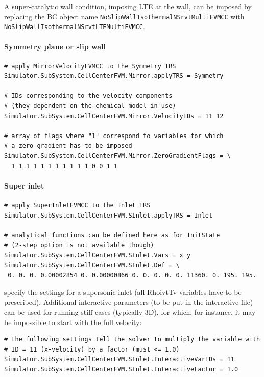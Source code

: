 \documentclass[11pt]{article}
\begin{document}
A super-catalytic wall condition, imposing LTE at the wall, can be imposed by replacing 
the BC object name {\tt NoSlipWallIsothermalNSrvtMultiFVMCC} with 
{\tt NoSlipWallIsothermalNSrvtLTEMultiFVMCC}. 

\paragraph{Symmetry plane or slip wall}

\begin{lstlisting}[breaklines]
# apply MirrorVelocityFVMCC to the Symmetry TRS 
Simulator.SubSystem.CellCenterFVM.Mirror.applyTRS = Symmetry

# IDs corresponding to the velocity components 
# (they dependent on the chemical model in use)
Simulator.SubSystem.CellCenterFVM.Mirror.VelocityIDs = 11 12

# array of flags where "1" correspond to variables for which 
# a zero gradient has to be imposed
Simulator.SubSystem.CellCenterFVM.Mirror.ZeroGradientFlags = \
  1 1 1 1 1 1 1 1 1 1 1 0 0 1 1
\end{lstlisting}

\paragraph{Super inlet}

\begin{lstlisting}[breaklines]
# apply SuperInletFVMCC to the Inlet TRS
Simulator.SubSystem.CellCenterFVM.SInlet.applyTRS = Inlet

# analytical functions can be defined here as for InitState 
# (2-step option is not available though)
Simulator.SubSystem.CellCenterFVM.SInlet.Vars = x y
Simulator.SubSystem.CellCenterFVM.SInlet.Def = \
 0. 0. 0. 0.00002854 0. 0.00000866 0. 0. 0. 0. 0. 11360. 0. 195. 195.
\end{lstlisting}
specify the settings for a supersonic inlet (all RhoivtTv variables have to be prescribed).
Additional interactive parameters (to be put in the interactive file) can be used 
for running stiff cases (typically 3D), for which, for instance, it may be impossible 
to start with the full velocity:

\begin{lstlisting}[breaklines]
# the following settings tell the solver to multiply the variable with 
# ID = 11 (x-velocity) by a factor (must <= 1.0)
Simulator.SubSystem.CellCenterFVM.SInlet.InteractiveVarIDs = 11
Simulator.SubSystem.CellCenterFVM.SInlet.InteractiveFactor = 1.0
\end{lstlisting}
\end{document}
